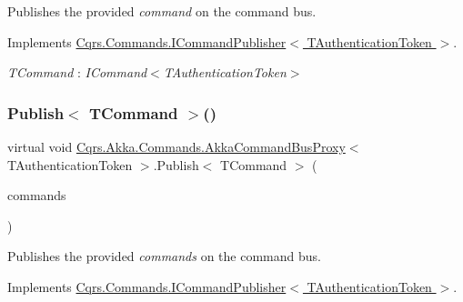Publishes the provided {\itshape command}  on the command bus. 



Implements \hyperlink{interfaceCqrs_1_1Commands_1_1ICommandPublisher_aeeb487ad5686d9c44d214b1daaf7833a_aeeb487ad5686d9c44d214b1daaf7833a}{Cqrs.\+Commands.\+I\+Command\+Publisher$<$ T\+Authentication\+Token $>$}.

\begin{Desc}
\item[Type Constraints]\begin{description}
\item[{\em T\+Command} : {\em I\+Command$<$T\+Authentication\+Token$>$}]\end{description}
\end{Desc}
\mbox{\label{classCqrs_1_1Akka_1_1Commands_1_1AkkaCommandBusProxy_a81dc8162ca933d84b6aee04aff589010_a81dc8162ca933d84b6aee04aff589010}} 
\subsubsection{\texorpdfstring{Publish$<$ T\+Command $>$()}{Publish< TCommand >()}\hspace{0.1cm}{\footnotesize\ttfamily [2/2]}}
{\footnotesize\ttfamily virtual void \hyperlink{classCqrs_1_1Akka_1_1Commands_1_1AkkaCommandBusProxy}{Cqrs.\+Akka.\+Commands.\+Akka\+Command\+Bus\+Proxy}$<$ T\+Authentication\+Token $>$.Publish$<$ T\+Command $>$ (\begin{DoxyParamCaption}\item[{I\+Enumerable$<$ T\+Command $>$}]{commands }\end{DoxyParamCaption})\hspace{0.3cm}{\ttfamily [virtual]}}



Publishes the provided {\itshape commands}  on the command bus. 



Implements \hyperlink{interfaceCqrs_1_1Commands_1_1ICommandPublisher_af0f033c0b949e5650032e4f00b11b595_af0f033c0b949e5650032e4f00b11b595}{Cqrs.\+Commands.\+I\+Command\+Publisher$<$ T\+Authentication\+Token $>$}.

